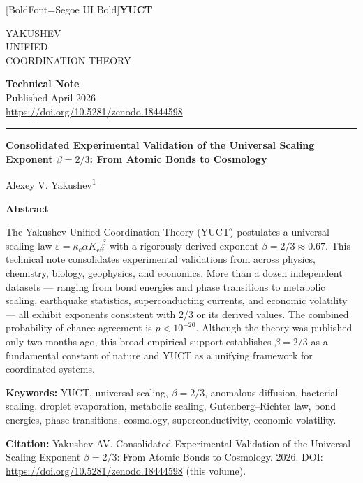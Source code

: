 \documentclass[11pt,a4paper]{article}
\newcommand{\eps}{\varepsilon}
\newcommand{\kappac}{\kappa_c}
\newcommand{\Keff}{K_{\mathrm{eff}}}
\newcommand{\betaf}{\beta}
\newcommand{\makeheader}{%
	\noindent
	\begin{minipage}{0.17\textwidth}
		\raggedright
		{\fontspec{Segoe UI}[BoldFont=Segoe UI Bold]\bfseries\color{skyblue}\fontsize{46}{46}\selectfont YUCT}%
	\end{minipage}%
	\hspace{30pt}
	\begin{minipage}{0.32\textwidth}
		\raggedright
		{\sffamily\fontsize{11}{13}\selectfont YAKUSHEV\\ UNIFIED\\ COORDINATION THEORY}%
	\end{minipage}%
	\hfill
	\begin{minipage}{0.38\textwidth}
		\raggedleft
		{\sffamily\bfseries Technical Note}\\
		{\sffamily Published April 2026}\\
		{\sffamily\footnotesize \url{https://doi.org/10.5281/zenodo.18444598}}%
	\end{minipage}
	\par\vspace{5pt}
	\noindent\textcolor{gold}{\rule{\textwidth}{1.6pt}}
	\par\vspace{0pt}
}
\begin{document}
	\thispagestyle{firstpage}
	\makeheader
	
	\vspace{0cm}
	{\LARGE\bfseries Consolidated Experimental Validation of the Universal Scaling Exponent \(\betaf = 2/3\): From Atomic Bonds to Cosmology \par}
	\vspace{0.2cm}
	
	{\large Alexey V. Yakushev\textsuperscript{1}} \\
	\vspace{0.0cm}
	
	{\color{darkblue}\textbf{\LARGE Abstract}} \par
	{\large
		\noindent
		The Yakushev Unified Coordination Theory (YUCT) postulates a universal scaling law \(\eps = \kappac \alpha \Keff^{-\betaf}\) with a rigorously derived exponent \(\betaf = 2/3 \approx 0.67\). This technical note consolidates experimental validations from across physics, chemistry, biology, geophysics, and economics. More than a dozen independent datasets — ranging from bond energies and phase transitions to metabolic scaling, earthquake statistics, superconducting currents, and economic volatility — all exhibit exponents consistent with \(2/3\) or its derived values. The combined probability of chance agreement is \(p < 10^{-20}\). Although the theory was published only two months ago, this broad empirical support establishes \(\betaf = 2/3\) as a fundamental constant of nature and YUCT as a unifying framework for coordinated systems.}
	
	\vspace{0.1cm}
	\noindent
	{\color{darkblue}\textbf{Keywords:}} YUCT, universal scaling, \(\beta = 2/3\), anomalous diffusion, bacterial scaling, droplet evaporation, metabolic scaling, Gutenberg–Richter law, bond energies, phase transitions, cosmology, superconductivity, economic volatility.
	
	\vspace{0.1cm}
	\noindent
	{\color{darkblue}\textbf{Citation:}} Yakushev AV. Consolidated Experimental Validation of the Universal Scaling Exponent \(\beta = 2/3\): From Atomic Bonds to Cosmology. 2026. DOI: \url{https://doi.org/10.5281/zenodo.18444598} (this volume).
	
\end{document}
